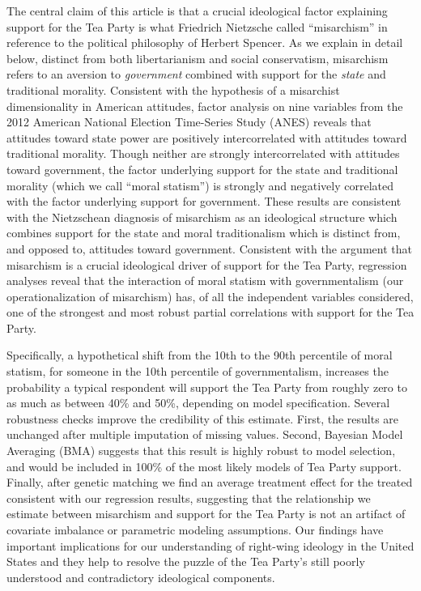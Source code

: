 \documentclass[12pt,]{article}
\begin{document}
The central claim of this article is that a crucial ideological factor
explaining support for the Tea Party is what Friedrich Nietzsche called
``misarchism'' in reference to the political philosophy of Herbert
Spencer. As we explain in detail below, distinct from both
libertarianism and social conservatism, misarchism refers to an aversion
to \emph{government} combined with support for the \emph{state} and
traditional morality. Consistent with the hypothesis of a misarchist
dimensionality in American attitudes, factor analysis on nine variables
from the 2012 American National Election Time-Series Study (ANES)
reveals that attitudes toward state power are positively intercorrelated
with attitudes toward traditional morality. Though neither are strongly
intercorrelated with attitudes toward government, the factor underlying
support for the state and traditional morality (which we call ``moral
statism'') is strongly and negatively correlated with the factor
underlying support for government. These results are consistent with the
Nietzschean diagnosis of misarchism as an ideological structure which
combines support for the state and moral traditionalism which is
distinct from, and opposed to, attitudes toward government. Consistent
with the argument that misarchism is a crucial ideological driver of
support for the Tea Party, regression analyses reveal that the
interaction of moral statism with governmentalism (our
operationalization of misarchism) has, of all the independent variables
considered, one of the strongest and most robust partial correlations
with support for the Tea Party.

Specifically, a hypothetical shift from the 10th to the 90th percentile
of moral statism, for someone in the 10th percentile of governmentalism,
increases the probability a typical respondent will support the Tea
Party from roughly zero to as much as between 40\% and 50\%, depending
on model specification. Several robustness checks improve the
credibility of this estimate. First, the results are unchanged after
multiple imputation of missing values. Second, Bayesian Model Averaging
(BMA) suggests that this result is highly robust to model selection, and
would be included in 100\% of the most likely models of Tea Party
support. Finally, after genetic matching we find an average treatment
effect for the treated consistent with our regression results,
suggesting that the relationship we estimate between misarchism and
support for the Tea Party is not an artifact of covariate imbalance or
parametric modeling assumptions. Our findings have important
implications for our understanding of right-wing ideology in the United
States and they help to resolve the puzzle of the Tea Party's still
poorly understood and contradictory ideological components.
\end{document}
